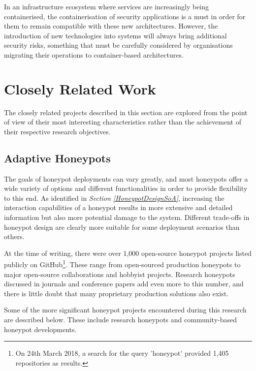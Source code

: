In an infrastructure ecosystem where services are increasingly being containerised, the containerisation of security applications is a must in order for them to remain compatible with these new architectures. However, the introduction of new technologies into systems will always bring additional security risks, something that must be carefully considered by organisations migrating their operations to container-based architectures. \cite{7742298} 




\section{Closely Related Work} \label{CloselyRelatedWork}


The closely related projects described in this section are explored from the point of view of their most interesting characteristics rather than the achievement of their respective research objectives.


\subsection{Adaptive Honeypots} \label{RelatedHoneypotProjects}

The goals of honeypot deployments can vary greatly, and most honeypots offer a wide variety of options and different functionalities in order to provide flexibility to this end. As identified in \textit{Section \ref{HoneypotDesignSoA}}, increasing the interaction capabilities of a honeypot results in more extensive and detailed information but also more potential damage to the system. Different trade-offs in honeypot design are clearly more suitable for some deployment scenarios than others.

At the time of writing, there were over 1,000 open-source honeypot projects listed publicly on GitHub\footnote{On 24th March 2018, a search for the query 'honeypot' provided 1,405 repositories as results.}. These range from open-sourced production honeypots to major open-source collaborations and hobbyist projects. Research honeypots discussed in journals and conference papers add even more to this number, and there is little doubt that many proprietary production solutions also exist. \cite{CanaryThinkst}

Some of the more significant honeypot projects encountered during this research are described below. These include research honeypots and community-based honeypot developments.%



